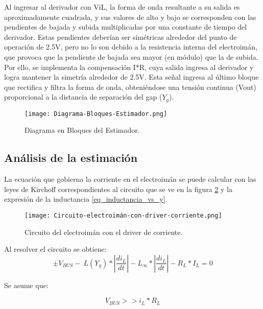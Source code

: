 \noindent Al ingresar al derivador con ViL, la forma de onda resultante a su salida es aproximadamente cuadrada, y sus valores de alto y bajo se corresponden con las pendientes de bajada y subida multiplicadas por una constante de tiempo del derivador. Estas pendientes deber\'{i}an ser sim\'{e}tricas alrededor del punto de operaci\'{o}n de 2.5V, pero no lo son debido a la resistencia interna del electroim\'{a}n, que provoca que la pendiente de bajada sea mayor (en m\'{o}dulo) que la de subida. Por ello, se implementa la compensaci\'{o}n I*R, cuya salida ingresa al derivador y logra mantener la simetr\'{i}a alrededor de 2.5V. Esta se\~{n}al ingresa al \'{u}ltimo bloque que rectifica y filtra la forma de onda, obteni\'{e}ndose una tensi\'{o}n continua (Vout) proporcional a la distancia de separaci\'{o}n del gap ($Y_{g}$).

\begin{figure}[H]
	\centering
	\texttt{[image: Diagrama-Bloques-Estimador.png]}
	\caption{Diagrama en Bloques del Estimador.}
	\label{fig:img_Diagrama-Bloques-Estimador.png}
\end{figure}

\subsection{An\'{a}lisis de la estimaci\'{o}n}

\noindent La ecuaci\'{o}n que gobierna la corriente en el electroim\'{a}n se puede calcular con las leyes de Kirchoff correspondientes al circuito que se ve en la figura \ref{fig:img_Circuito-electroimán-con-driver-corriente.png} y la expresión de la inductancia \ref{eq_inductancia_vs_y}.

\begin{figure}[H]
	\centering
	\texttt{[image: Circuito-electroimán-con-driver-corriente.png]}
	\caption{Circuito del electroimán con el driver de corriente.}
	\label{fig:img_Circuito-electroimán-con-driver-corriente.png}
\end{figure} 

\noindent Al resolver el circuito se obtiene:
\begin{equation} \label{eq_VbusCondicion}
	\pm V_{BUS}-\ L(Y_g)*\left|\frac{{di}_L}{dt}\right|-L_{\infty }*\left|\frac{{di}_L}{dt}\right|-R_L*I_L=0
\end{equation}


\noindent Se asume que:

\begin{equation} \label{eq_Derivadadi-dt}
	V_{BUS}>>i_L*R_L
\end{equation}
 
